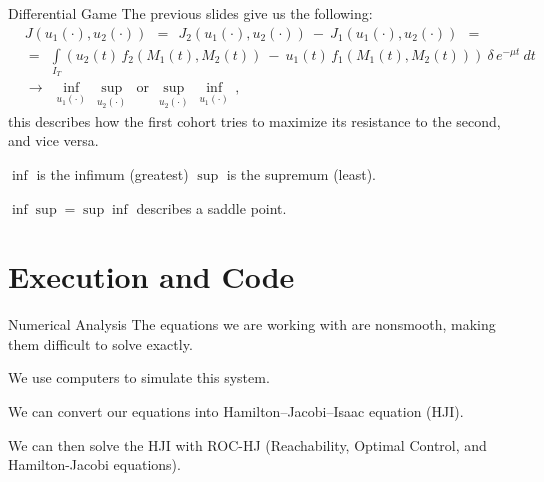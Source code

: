 \documentclass{beamer}
\begin{document}
\begin{frame}{Differential Game}
    The previous slides give us the following:
    $$
    \begin{aligned}
    & J(u_1(\cdot), u_2(\cdot)) \:\: = \:\: J_2(u_1(\cdot), u_2(\cdot)) \: - \: J_1(u_1(\cdot), u_2(\cdot)) \:\: = \\
    & = \:\: \int\limits_{I_T} (u_2(t) \, f_2(M_1(t), M_2(t)) \: - \: u_1(t) \, f_1(M_1(t), M_2(t))) \: \delta \, e^{-\mu t} \: dt \:\:
    \\& \longrightarrow \:\: \inf_{u_1(\cdot)} \: \sup_{u_2(\cdot)} \:\: \mbox{or} \:\:
    \sup_{u_2(\cdot)} \: \inf_{u_1(\cdot)} \, ,
    \end{aligned}
    $$ 
    this describes how the first cohort tries to maximize its resistance to the second, and vice versa.\newline
    
    $\inf$ is the infimum (greatest) $\sup$ is the supremum (least).\newline
    
    $\inf\sup=\sup\inf$ describes a saddle point.
    
\end{frame}

\section{Execution and Code}
\begin{frame}{Numerical Analysis}
    The equations we are working with are nonsmooth, making them difficult to solve exactly. \newline

    We use computers to simulate this system. \newline
    
    We can convert our equations into Hamilton--Jacobi--Isaac equation (HJI). \newline
    
    We can then solve the HJI with ROC-HJ (Reachability, Optimal Control, and Hamilton-Jacobi equations).
\end{frame}
\end{document}
